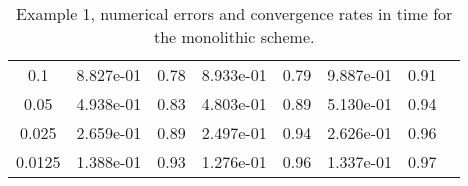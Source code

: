 \documentclass[11pt]{article}
\begin{document}
\begin{table}[htb!]
\begin{tabular}{|c|c|c|c|c|c|c|c|}
		{\small{}0.1} & {\small{}8.827e-01    } & {\small{}0.78 } & {\small{}   8.933e-01     } & {\small{} 0.79} & {\small{} 9.887e-01} & {\small{}0.91 }  \tabularnewline
		
		{\small{}0.05} & {\small{} 4.938e-01     } & {\small{}0.83 } & {\small{} 4.803e-01     } & {\small{}0.89 } & {\small{}5.130e-01} & {\small{}0.94} \tabularnewline
		
		{\small{}0.025} & {\small{} 2.659e-01   } & {\small{}0.89 } & {\small{} 2.497e-01   } & {\small{}0.94 } & {\small{}2.626e-01} & {\small{} 0.96}  \tabularnewline
		
		{\small{}0.0125} & {\small{}  1.388e-01      } & {\small{}0.93  } & {\small{} 1.276e-01      } & {\small{}0.96 } & {\small{}1.337e-01} & {\small{} 0.97 } \tabularnewline
		\hline
	\end{tabular}
\caption{Example 1, numerical errors and convergence rates in time 
  for the monolithic scheme.} \label{tab:Errors-Convergence rates-3}
\end{table}
\end{document}
